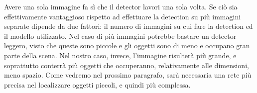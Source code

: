 \label{sec:master_small_img}Avere una sola immagine fa sì che il detector lavori una sola volta. Se ciò sia effettivamente vantaggioso rispetto ad effettuare la detection su più immagini separate dipende da due fattori: il numero di immagini su cui fare la detection ed il modello utilizzato. Nel caso di più immagini potrebbe bastare un detector leggero, visto che queste sono piccole e gli oggetti sono di meno e occupano gran parte della scena. Nel nostro caso, invece, l'immagine risulterà più grande, e soprattutto conterrà più oggetti che occuperanno, relativamente alle dimensioni, meno spazio. Come vedremo nel prossimo paragrafo, sarà necessaria una rete più precisa nel localizzare oggetti piccoli, e quindi più complessa.